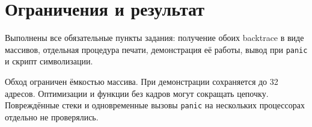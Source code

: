 \documentclass[12pt,a4paper]{article}
\begin{document}
\section{Ограничения и результат}

Выполнены все обязательные пункты задания: получение обоих backtrace в виде массивов, отдельная процедура печати, демонстрация её работы, вывод при \texttt{panic} и скрипт символизации.

Обход ограничен ёмкостью массива. При демонстрации сохраняется до 32 адресов. Оптимизации и функции без кадров могут сокращать цепочку. Повреждённые стеки и одновременные вызовы \texttt{panic} на нескольких процессорах отдельно не проверялись.
\end{document}
